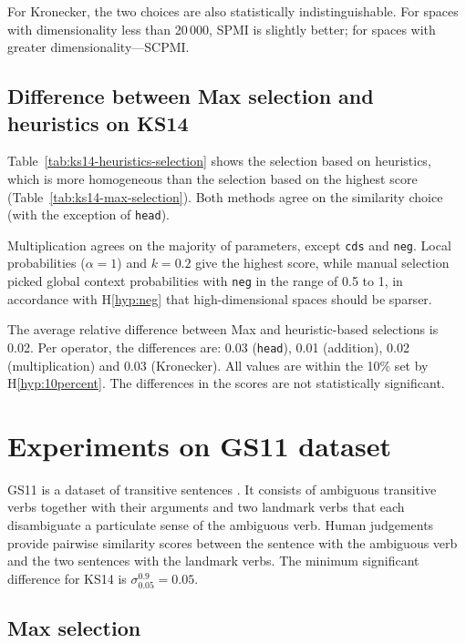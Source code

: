 For Kronecker, the two choices are also statistically indistinguishable. For spaces with dimensionality less than 20\,000, SPMI is slightly better; for spaces with greater dimensionality---SCPMI.

\subsection{Difference between Max selection and heuristics on KS14}

Table~\ref{tab:ks14-heuristics-selection} shows the selection based on heuristics, which is more homogeneous than the selection based on the highest score (Table~\ref{tab:ks14-max-selection}). Both methods agree on the similarity choice (with the exception of \texttt{head}).

Multiplication agrees on the majority of parameters, except \texttt{cds} and \texttt{neg}. Local probabilities ($\alpha = 1$) and $k = 0.2$ give the highest score, while manual selection picked global context probabilities with \texttt{neg} in the range of 0.5 to 1, in accordance with H\ref{hyp:neg} that high-dimensional spaces should be sparser.

The average relative difference between Max and heuristic-based selections is 0.02. Per operator, the differences are: 0.03 (\texttt{head}), 0.01 (addition), 0.02 (multiplication) and 0.03 (Kronecker). All values are within the 10\% set by H\ref{hyp:10percent}. The differences in the scores are not statistically significant.

\section{Experiments on GS11 dataset}
\label{sec:gs11}

GS11 is a dataset of transitive sentences \cite{Grefenstette:2011:ESC:2145432.2145580,Grefenstette:2011:ETV:2140490.2140497}. It consists of ambiguous transitive verbs together with their arguments and two landmark verbs that each disambiguate a particulate sense of the ambiguous verb. Human judgements provide pairwise similarity scores between the sentence with the ambiguous verb and the two sentences with the landmark verbs. The minimum significant difference for KS14 is $\sigma^{0.9}_{0.05} = 0.05$.

\subsection{Max selection}
\label{sec:max-selection-gs11}


